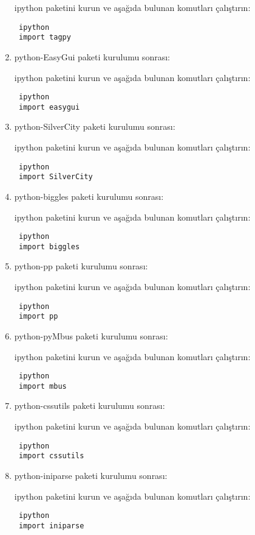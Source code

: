 \documentclass[a4paper,10pt]{article}
\begin{document}
\begin{enumerate}
ipython paketini kurun ve aşağıda bulunan komutları çalıştırın:
\begin{verbatim}
 ipython
 import tagpy
\end{verbatim}

\item python-EasyGui paketi kurulumu sonrası:

ipython paketini kurun ve aşağıda bulunan komutları çalıştırın:
\begin{verbatim}
 ipython
 import easygui
\end{verbatim}

\item python-SilverCity paketi kurulumu sonrası:

ipython paketini kurun ve aşağıda bulunan komutları çalıştırın:
\begin{verbatim}
 ipython
 import SilverCity
\end{verbatim}

\item python-biggles paketi kurulumu sonrası:

ipython paketini kurun ve aşağıda bulunan komutları çalıştırın:
\begin{verbatim}
 ipython
 import biggles
\end{verbatim}

\item python-pp paketi kurulumu sonrası:

ipython paketini kurun ve aşağıda bulunan komutları çalıştırın:
\begin{verbatim}
 ipython
 import pp
\end{verbatim}

\item python-pyMbus paketi kurulumu sonrası:

ipython paketini kurun ve aşağıda bulunan komutları çalıştırın:
\begin{verbatim}
 ipython
 import mbus
\end{verbatim}

\item python-cssutils paketi kurulumu sonrası:

ipython paketini kurun ve aşağıda bulunan komutları çalıştırın:
\begin{verbatim}
 ipython
 import cssutils
\end{verbatim}

\item python-iniparse paketi kurulumu sonrası:

ipython paketini kurun ve aşağıda bulunan komutları çalıştırın:
\begin{verbatim}
 ipython
 import iniparse
\end{verbatim}


\end{enumerate}
\end{document}
